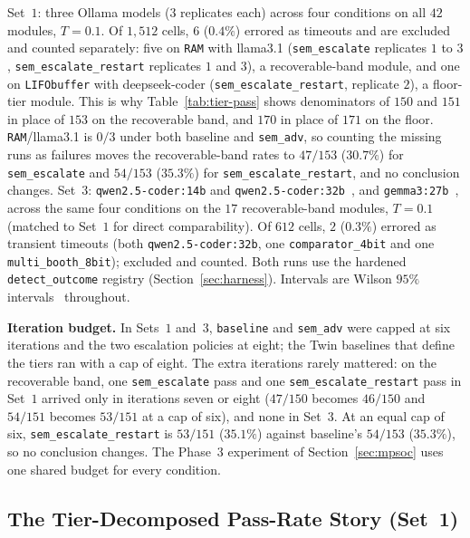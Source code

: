 \documentclass[11pt]{article}
\begin{document}
Set~$1$: three Ollama models ($3$ replicates each) across four conditions on
all $42$ modules, $T{=}0.1$. Of $1{,}512$ cells, $6$ ($0.4\%$) errored as
timeouts and are excluded and counted separately: five on \texttt{RAM} with
llama3.1 (\texttt{sem\_escalate} replicates $1$ to $3$,
\texttt{sem\_escalate\_restart} replicates $1$ and $3$), a recoverable-band
module, and one on \texttt{LIFObuffer} with deepseek-coder
(\texttt{sem\_escalate\_restart}, replicate $2$), a floor-tier module. This is
why Table~\ref{tab:tier-pass} shows denominators of $150$ and $151$ in place
of $153$ on the recoverable band, and $170$ in place of $171$ on the floor.
\texttt{RAM}/llama3.1 is $0/3$ under both baseline and \texttt{sem\_adv}, so
counting the missing runs as failures moves the recoverable-band rates to
$47/153$ ($30.7\%$) for \texttt{sem\_escalate} and $54/153$ ($35.3\%$) for
\texttt{sem\_escalate\_restart}, and no conclusion changes. Set~$3$:
\texttt{qwen2.5-coder:14b} and \texttt{qwen2.5-coder:32b}~\cite{qwen25coder},
and \texttt{gemma3:27b}~\cite{gemma3}, across the same four conditions on the
$17$ recoverable-band modules, $T{=}0.1$ (matched to Set~$1$ for direct
comparability). Of $612$ cells, $2$ ($0.3\%$) errored as transient timeouts
(both \texttt{qwen2.5-coder:32b}, one \texttt{comparator\_4bit} and one
\texttt{multi\_booth\_8bit}); excluded and counted. Both runs use the hardened
\texttt{detect\_outcome} registry (Section~\ref{sec:harness}). Intervals are
Wilson $95\%$ intervals~\cite{wilson1927} throughout.

\textbf{Iteration budget.} In Sets~$1$ and~$3$, \texttt{baseline} and
\texttt{sem\_adv} were capped at six iterations and the two escalation
policies at eight; the Twin baselines that define the tiers ran with a cap of
eight. The extra iterations rarely mattered: on the recoverable band, one
\texttt{sem\_escalate} pass and one \texttt{sem\_escalate\_restart} pass in
Set~$1$ arrived only in iterations seven or eight ($47/150$ becomes $46/150$
and $54/151$ becomes $53/151$ at a cap of six), and none in Set~$3$. At an
equal cap of six, \texttt{sem\_escalate\_restart} is $53/151$ ($35.1\%$)
against baseline's $54/153$ ($35.3\%$), so no conclusion changes. The Phase~3
experiment of Section~\ref{sec:mpsoc} uses one shared budget for every
condition.

\subsection{The Tier-Decomposed Pass-Rate Story (Set~1)}
\label{sec:stitch-rtllm-pass}
\end{document}
